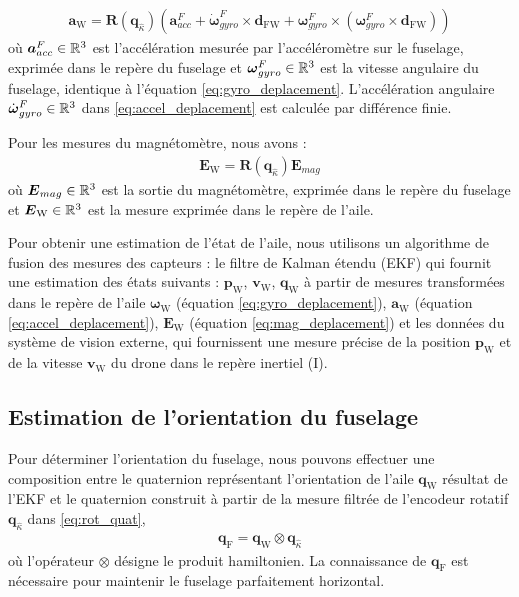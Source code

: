 \begin{align}
    \label{eq:accel_deplacement}
    \boldsymbol{a}_{\text{W}} = \boldsymbol{R}(\boldsymbol{q}_{\hat{\kappa}}) \left( \boldsymbol{a}_{acc}^{F} + \dot{\boldsymbol{\omega}}_{gyro}^{F} \times \boldsymbol{d}_{\text{FW}} + \boldsymbol{\omega}_{gyro}^{F} \times ( \boldsymbol{\omega}_{gyro}^{F} \times  \boldsymbol{d}_{\text{FW}}) \right) 
\end{align}
où $\boldsymbol{a}_{acc}^{F} \in {\mathbb R}^{3}$ est l'accélération mesurée par l'accéléromètre sur le fuselage, exprimée dans le repère du fuselage et $\boldsymbol{\omega}_{gyro}^{F} \in {\mathbb R}^{3}$ est la vitesse angulaire du fuselage, identique à l'équation \eqref{eq:gyro_deplacement}. L'accélération angulaire $\dot{\boldsymbol{\omega}}_{gyro}^{F} \in {\mathbb R}^{3}$ dans \eqref{eq:accel_deplacement} est calculée par différence finie.


Pour les mesures du magnétomètre, nous avons :
\begin{align}
    \label{eq:mag_deplacement}
    \boldsymbol{E}_{\text{W}} = \boldsymbol{R}(\boldsymbol{q}_{\hat{\kappa}}) \boldsymbol{E}_{mag}
\end{align}
où $\boldsymbol{E}_{mag} \in {\mathbb R}^{3}$ est la sortie du magnétomètre, exprimée dans le repère du fuselage et $ \boldsymbol{E}_{\text{W}} \in {\mathbb R}^{3}$ est la mesure exprimée dans le repère de l'aile.

Pour obtenir une estimation de l'état de l'aile, nous utilisons un algorithme de fusion des mesures des capteurs : le filtre de Kalman étendu (EKF)   qui fournit une estimation des états suivants : $\boldsymbol{p}_{\text{W}}$, $\boldsymbol{v}_{\text{W}}$, $\boldsymbol{q}_{\text{W}}$ à partir de mesures transformées dans le repère de l'aile $\boldsymbol{\omega}_{\text{W}}$ (équation \eqref{eq:gyro_deplacement}), $\boldsymbol{a}_{\text{W}}$ (équation \eqref{eq:accel_deplacement}), $\boldsymbol{E}_{\text{W}}$ (équation \eqref{eq:mag_deplacement}) et les données du système de vision externe, qui fournissent une mesure précise de la position $\boldsymbol{p}_{\text{W}}$ et de la vitesse $\boldsymbol{v}_{\text{W}}$ du drone dans le repère inertiel (I).


\subsection{Estimation de l'orientation du fuselage}
Pour déterminer l'orientation du fuselage, nous pouvons effectuer une composition entre le quaternion représentant l'orientation de l'aile $\boldsymbol{q}_{\text{W}}$ résultat de l'EKF et le quaternion construit à partir de la mesure filtrée de l'encodeur rotatif $\boldsymbol{q}_{\hat{\kappa}}$ dans \eqref{eq:rot_quat},
\begin{align}
\label{eq:quat_fuselage}
\boldsymbol{q}_{\text{F}} = \boldsymbol{q}_{\text{W}} \otimes \boldsymbol{q}_{\hat{\kappa}}
\end{align}
où l'opérateur $\otimes$ désigne le produit hamiltonien. La connaissance de $\boldsymbol{q}_{\text{F}}$ est nécessaire pour maintenir le fuselage parfaitement horizontal. 


